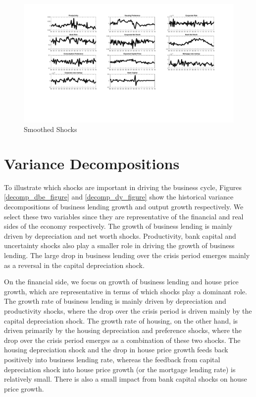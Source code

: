 \documentclass[12pt]{article}
\numberwithin{equation}{section}
\begin{document}
\begin{figure}[H]
\label{smoothed_shocks_figure}
\caption{Smoothed Shocks}
\includegraphics[scale=0.55]{smoothed_shocks.pdf}
\end{figure}



\section*{Variance Decompositions}





To illustrate which shocks are important in driving the business cycle, Figures \ref{decomp_dbe_figure} and \ref{decomp_dy_figure} show the historical variance decompositions of business lending growth and output growth respectively. We select these two variables since they are representative of the financial and real sides of the economy respectively. The growth of business lending is mainly driven by depreciation and net worth shocks. Productivity, bank capital and uncertainty shocks also play a smaller role in driving the growth of business lending. The large drop in business lending over the crisis period emerges mainly as a reversal in the capital depreciation shock. 



  On the financial side, we focus on growth of business lending and house price growth, which are representative in terms of which shocks play a dominant role. 
 The growth rate of business lending is mainly driven by depreciation and productivity shocks, where the drop over the crisis period is driven mainly by the capital depreciation shock. The growth rate of housing, on the other hand, is driven primarily by the housing depreciation and preference shocks, where the drop over the crisis period emerges as a combination of these two shocks. The housing depreciation shock and the drop in house price growth feeds back positively into business lending rate, whereas the feedback from capital depreciation shock into house price growth (or the mortgage lending rate) is relatively small. There is also a small impact from bank capital shocks on house price growth. 
\end{document}
